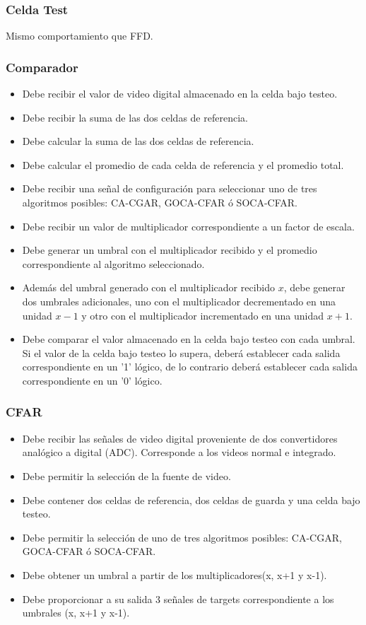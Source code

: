 \subsubsection{Celda Test}
Mismo comportamiento que FFD.

\subsubsection{Comparador}
\begin{itemize}
\item Debe recibir el valor de video digital almacenado en la celda bajo testeo.
\item Debe recibir la suma de las dos celdas de referencia.
\item Debe calcular la suma de las dos celdas de referencia.
\item Debe calcular el promedio de cada celda de referencia y el promedio total.
\item Debe recibir una señal de configuración para seleccionar uno de tres algoritmos posibles: CA-CGAR, GOCA-CFAR ó SOCA-CFAR.
\item Debe recibir un valor de multiplicador correspondiente a un factor de escala.
\item Debe generar un umbral con el multiplicador recibido y el promedio correspondiente al algoritmo seleccionado.
\item Además del umbral generado con el multiplicador recibido $x$, debe generar dos umbrales adicionales, uno con el multiplicador decrementado en una unidad $x-1$ y otro con el multiplicador incrementado en una unidad $x+1$.
\item Debe comparar el valor almacenado en la celda bajo testeo con cada umbral. Si el valor de la celda bajo testeo lo supera, deberá establecer cada salida correspondiente en un '1' lógico, de lo contrario deberá establecer cada salida correspondiente en un '0' lógico.
\end{itemize}


\subsubsection{CFAR}
\begin{itemize}
\item Debe recibir las señales de video digital proveniente de dos convertidores analógico a digital (ADC). Corresponde a los videos normal e integrado.
\item Debe permitir la selección de la fuente de video.
\item Debe contener dos celdas de referencia, dos celdas de guarda y una celda bajo testeo.
\item Debe permitir la selección de uno de tres algoritmos posibles: CA-CGAR, GOCA-CFAR ó SOCA-CFAR.
\item Debe obtener un umbral a partir de los multiplicadores(x, x+1 y x-1).
\item Debe proporcionar a su salida 3 señales de targets correspondiente a los umbrales (x, x+1 y x-1).
\end{itemize}



